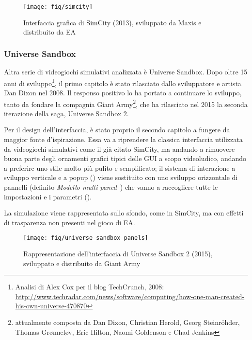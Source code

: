                 \begin{figure}[htbp]
                    \centering
                    \texttt{[image: fig/simcity]}
                    \caption{Interfaccia grafica di SimCity (2013), sviluppato da Maxis e distribuito da EA}
                    \label{fig:simcity}
                \end{figure}

            \subsubsection{Universe Sandbox}\label{subsubsec:universesandbox}
                Altra serie di videogiochi simulativi analizzata è Universe Sandbox.
                Dopo oltre 15 anni di sviluppo\footnote{Analisi di Alex Cox per il blog TechCrunch, 2008:
                \url{http://www.techradar.com/news/software/computing/how-one-man-created-his-own-universe-470870}}, il primo capitolo è stato rilasciato dallo sviluppatore e artista Dan Dixon nel 2008.
                Il responso positivo lo ha portato a continuare lo sviluppo, tanto da fondare la compagnia Giant Army\footnote{attualmente composta da Dan Dixon, Christian Herold, Georg Steinröhder, Thomas Grønneløv, Eric Hilton, Naomi Goldenson e Chad Jenkins}, che ha rilasciato nel 2015 la seconda iterazione della saga, Universe Sandbox 2.

                Per il design dell'interfaccia, è stato proprio il secondo capitolo a fungere da maggior fonte d'ispirazione.
                Essa va a riprendere la classica interfaccia utilizzata da videogiochi simulativi come il già citato SimCity, ma andando a rimuovere buona parte degli ornamenti grafici tipici delle GUI a scopo videoludico, andando a preferire uno stile molto più pulito e semplificato;
                il sistema di interazione a sviluppo verticale e a popup () viene sostituito con uno sviluppo orizzontale di pannelli (definito \emph{Modello multi-paned}~\cite{multipanedmodel}) che vanno a raccogliere tutte le impostazioni e i parametri ().

                La simulazione viene rappresentata sullo sfondo, come in SimCity, ma con effetti di trasparenza non presenti nel gioco di EA.

                \begin{figure}[htbp]
                    \centering
                    \texttt{[image: fig/universe\_sandbox\_panels]}
                    \caption{Rappresentazione dell'interfaccia di Universe Sandbox 2 (2015), sviluppato e distribuito da Giant Army}
                    \label{fig:universesandboxpanels}
                \end{figure}

